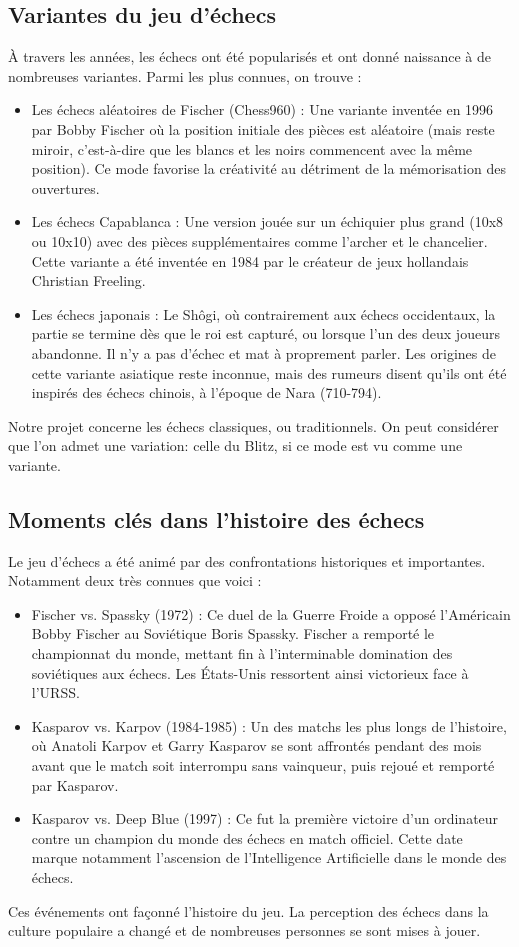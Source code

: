 \documentclass{article}
\begin{document}
\subsection{Variantes du jeu d'échecs}
À travers les années, les échecs ont été popularisés et ont donné naissance à de nombreuses variantes. Parmi les plus connues, on trouve :
\begin{itemize}
    \item Les échecs aléatoires de Fischer (Chess960) : Une variante inventée en 1996 par Bobby Fischer où la position initiale des pièces est aléatoire
    (mais reste miroir, c'est-à-dire que les blancs et les noirs commencent avec la même position). Ce mode favorise la créativité au détriment de la mémorisation des ouvertures.
    \item Les échecs Capablanca : Une version jouée sur un échiquier plus grand (10x8 ou 10x10) avec des pièces supplémentaires comme l'archer et le chancelier. Cette variante a été inventée en 1984 par le créateur de jeux hollandais Christian Freeling.
    \item Les échecs japonais : Le Shôgi, où contrairement aux échecs occidentaux, la partie se termine dès que le roi est capturé, ou lorsque l'un
    des deux joueurs abandonne. Il n'y a pas d'échec et mat à proprement parler. Les origines de cette variante asiatique reste inconnue,
    mais des rumeurs disent qu'ils ont été inspirés des échecs chinois, à l'époque de Nara (710-794).
\end{itemize}
Notre projet concerne les échecs classiques, ou traditionnels. On peut considérer que l'on admet une variation: celle du Blitz, si ce mode
est vu comme une variante.

\subsection{Moments clés dans l’histoire des échecs}
Le jeu d’échecs a été animé par des confrontations historiques et importantes. Notamment deux très connues que voici :
\begin{itemize}
    \item Fischer vs. Spassky (1972) : Ce duel de la Guerre Froide a opposé l’Américain Bobby Fischer au Soviétique
    Boris Spassky. Fischer a remporté le championnat du monde, mettant fin à l'interminable domination des soviétiques
    aux échecs. Les États-Unis ressortent ainsi victorieux face à l'URSS.
    \item Kasparov vs. Karpov (1984-1985) : Un des matchs les plus longs de l’histoire, où Anatoli Karpov et Garry Kasparov
    se sont affrontés pendant des mois avant que le match soit interrompu sans vainqueur, puis rejoué et remporté par Kasparov.
    \item Kasparov vs. Deep Blue (1997) : Ce fut la première victoire d'un ordinateur contre un champion du monde des échecs en match officiel.
    Cette date marque notamment l'ascension de l'Intelligence Artificielle dans le monde des échecs.
\end{itemize}
Ces événements ont façonné l’histoire du jeu. La perception des échecs dans la culture populaire a changé et de nombreuses
personnes se sont mises à jouer.
\end{document}
